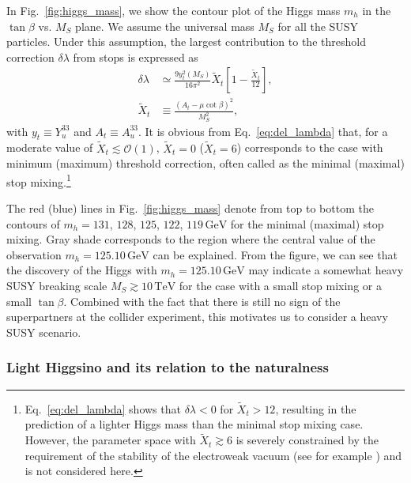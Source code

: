 \documentclass[12pt,twoside,book]{article}
\begin{document}
In Fig.~\ref{fig:higgs_mass}, we show the contour plot of the Higgs mass $m_h$ in the $\tan\beta$ vs. $M_S$ plane.
We assume the universal mass $M_S$ for all the SUSY particles.
Under this assumption, the largest contribution to the threshold correction $\delta \lambda$ from stops is expressed as
\begin{align}
  \delta \lambda &\simeq \frac{9 y_t^2 (M_S)}{16 \pi^2} \tilde{X}_t \left[ 1-\frac{\tilde{X}_t}{12} \right], \label{eq:del_lambda}\\
  \tilde{X}_t &\equiv \frac{(A_t - \mu \cot \beta)^2}{M_S^2},
\end{align}
with $y_t \equiv Y_u^{33}$ and $A_t \equiv A_u^{33}$.
It is obvious from Eq.~\eqref{eq:del_lambda} that, for a moderate value of $\tilde{X}_t \lesssim \mathcal{O}(1)$, $\tilde{X}_t = 0$ ($\tilde{X}_t = 6$) corresponds to the case with minimum (maximum) threshold correction, often called as the minimal (maximal) stop mixing.\footnote
{
  Eq.~\eqref{eq:del_lambda} shows that $\delta \lambda < 0$ for $\tilde{X}_t > 12$, resulting in the prediction of a lighter Higgs mass than the minimal stop mixing case.
  However, the parameter space with $\tilde{X}_t \gtrsim 6$ is severely constrained by the requirement of the stability of the electroweak vacuum (see for example \cite{Bagnaschi:2014rsa}) and is not considered here.
}

The red (blue) lines in Fig.~\ref{fig:higgs_mass} denote from top to bottom the contours of $m_h = 131$, $128$, $125$, $122$, $119\, \mathrm{GeV}$ for the minimal (maximal) stop mixing.
Gray shade corresponds to the region where the central value of the observation $m_h = 125.10\,\mathrm{GeV}$ can be explained.
From the figure, we can see that the discovery of the Higgs with $m_h = 125.10\,\mathrm{GeV}$ may indicate a somewhat heavy SUSY breaking scale $M_S \gtrsim 10\,\mathrm{TeV}$ for the case with a small stop mixing or a small $\tan \beta$.
Combined with the fact that there is still no sign of the superpartners at the collider experiment, this motivates us to consider a heavy SUSY scenario.


\subsubsection*{Light Higgsino and its relation to the naturalness}
\end{document}
